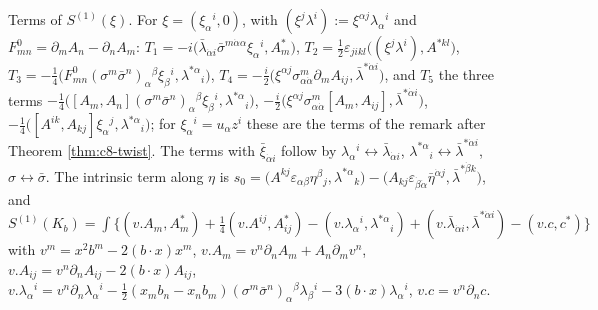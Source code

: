 \item Terms of $S^{(1)}(\xi)$. For $\xi=(\xi_\alpha{}^i,0)$, with $(\xi^j\lambda^i):=\xi^{\alpha j}\lambda_\alpha{}^i$ and $F^0_{mn}=\partial_mA_n-\partial_nA_m$: $T_1=-i\big(\bar\lambda_{\dot\alpha i}\bar\sigma^{m\dot\alpha\alpha}\xi_\alpha{}^i,A^*_m\big)$, $T_2=\tfrac12\varepsilon_{jikl}\big((\xi^j\lambda^i),A^{*kl}\big)$, $T_3=-\tfrac14\big(F^0_{mn}(\sigma^m\bar\sigma^n)_\alpha{}^\beta\xi_\beta{}^i,\lambda^{*\alpha}{}_i\big)$, $T_4=-\tfrac i2\big(\xi^{\alpha j}\sigma^m_{\alpha\dot\alpha}\partial_mA_{ij},\bar\lambda^{*\dot\alpha i}\big)$, and $T_5$ the three terms $-\tfrac14\big([A_m,A_n](\sigma^m\bar\sigma^n)_\alpha{}^\beta\xi_\beta{}^i,\lambda^{*\alpha}{}_i\big)$, $-\tfrac i2\big(\xi^{\alpha j}\sigma^m_{\alpha\dot\alpha}[A_m,A_{ij}],\bar\lambda^{*\dot\alpha i}\big)$, $-\tfrac14\big([A^{ik},A_{kj}]\xi_\alpha{}^j,\lambda^{*\alpha}{}_i\big)$; for $\xi_\alpha{}^i=u_\alpha z^i$ these are the terms of the remark after Theorem \ref{thm:c8-twist}. The terms with $\bar\xi_{\dot\alpha i}$ follow by $\lambda_\alpha{}^i\leftrightarrow\bar\lambda_{\dot\alpha i}$, $\lambda^{*\alpha}{}_i\leftrightarrow\bar\lambda^{*\dot\alpha i}$, $\sigma\leftrightarrow\bar\sigma$. The intrinsic term along $\eta$ is $s_0=\big(A^{kj}\varepsilon_{\alpha\beta}\eta^\beta{}_j,\lambda^{*\alpha}{}_k\big)-\big(A_{kj}\varepsilon_{\dot\beta\dot\alpha}\bar\eta^{\dot\alpha j},\bar\lambda^{*\dot\beta k}\big)$, and $S^{(1)}(K_b)=\int\big\{(v.A_m,A^*_m)+\tfrac14(v.A^{ij},A^*_{ij})-(v.\lambda_\alpha{}^i,\lambda^{*\alpha}{}_i)+(v.\bar\lambda_{\dot\alpha i},\bar\lambda^{*\dot\alpha i})-(v.c,c^*)\big\}$ with $v^m=x^2b^m-2(b\cdot x)x^m$, $v.A_m=v^n\partial_nA_m+A_n\partial_mv^n$, $v.A_{ij}=v^n\partial_nA_{ij}-2(b\cdot x)A_{ij}$, $v.\lambda_\alpha{}^i=v^n\partial_n\lambda_\alpha{}^i-\tfrac12(x_mb_n-x_nb_m)(\sigma^m\bar\sigma^n)_\alpha{}^\beta\lambda_\beta{}^i-3(b\cdot x)\lambda_\alpha{}^i$, $v.c=v^n\partial_nc$.
